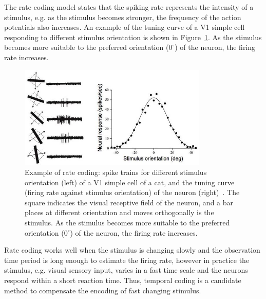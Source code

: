The rate coding model states that the spiking rate represents the intensity of a stimulus, e.g. as the stimulus becomes stronger, the frequency of the action potentials also increases.
An example of the tuning curve of a V1 simple cell responding to different stimulus orientation is shown in Figure~\ref{Fig:v1}.
As the stimulus becomes more suitable to the preferred orientation ($0^\circ$) of the neuron, the firing rate increases.

\begin{figure}[bt]
	\centering
	\includegraphics[width=0.8\textwidth]{pics_snn/v1.jpg}
	\caption{Example of rate coding: spike trains for different stimulus orientation (left) of a V1 simple cell of a cat, and the tuning curve (firing rate against stimulus orientation) of the neuron (right)~\cite{hubel1962receptive}.
	The square indicates the visual receptive field of the neuron, and a bar places at different orientation and moves orthogonally is the stimulus.
    As the stimulus becomes more suitable to the preferred orientation ($0^\circ$) of the neuron, the firing rate increases.}
	\label{Fig:v1}
\end{figure}

Rate coding works well when the stimulus is changing slowly and the observation time period is long enough to estimate the firing rate, however in practice the stimulus, e.g. visual sensory input, varies in a fast time scale and the neurons respond within a short reaction time.
Thus, temporal coding is a candidate method to compensate the encoding of fast changing stimulus.


